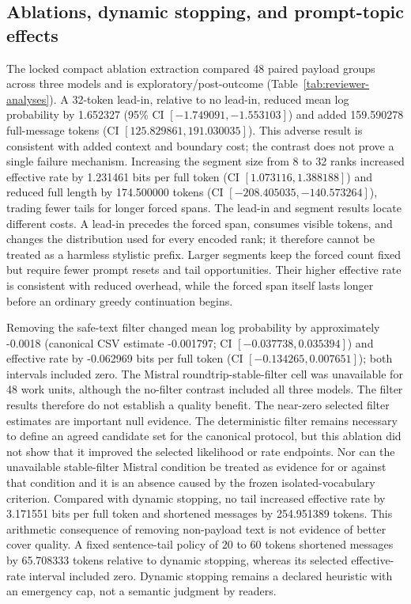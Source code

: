 \documentclass[fleqn,10pt]{wlscirep}
\begin{document}
\subsection*{Ablations, dynamic stopping, and prompt-topic effects}\label{sec:results-ablations}

The locked compact ablation extraction compared 48 paired payload groups across three models and is exploratory/post-outcome (Table~\ref{tab:reviewer-analyses}). A 32-token lead-in, relative to no lead-in, reduced mean log probability by 1.652327 (95\% CI \([-1.749091,\allowbreak -1.553103]\)) and added 159.590278 full-message tokens (CI \([125.829861,\allowbreak 191.030035]\)). This adverse result is consistent with added context and boundary cost; the contrast does not prove a single failure mechanism. Increasing the segment size from 8 to 32 ranks increased effective rate by 1.231461 bits per full token (CI \([1.073116,\allowbreak 1.388188]\)) and reduced full length by 174.500000 tokens (CI \([-208.405035,\allowbreak -140.573264]\)), trading fewer tails for longer forced spans.
The lead-in and segment results locate different costs. A lead-in precedes the forced span, consumes visible tokens, and changes the distribution used for every encoded rank; it therefore cannot be treated as a harmless stylistic prefix. Larger segments keep the forced count fixed but require fewer prompt resets and tail opportunities. Their higher effective rate is consistent with reduced overhead, while the forced span itself lasts longer before an ordinary greedy continuation begins.

Removing the safe-text filter changed mean log probability by approximately -0.0018 (canonical CSV estimate -0.001797; CI \([-0.037738, 0.035394]\)) and effective rate by -0.062969 bits per full token (CI \([-0.134265, 0.007651]\)); both intervals included zero. The Mistral roundtrip-stable-filter cell was unavailable for 48 work units, although the no-filter contrast included all three models. The filter results therefore do not establish a quality benefit.
The near-zero selected filter estimates are important null evidence. The deterministic filter remains necessary to define an agreed candidate set for the canonical protocol, but this ablation did not show that it improved the selected likelihood or rate endpoints. Nor can the unavailable stable-filter Mistral condition be treated as evidence for or against that condition and it is an absence caused by the frozen isolated-vocabulary criterion.
Compared with dynamic stopping, no tail increased effective rate by 3.171551 bits per full token and shortened messages by 254.951389 tokens. This arithmetic consequence of removing non-payload text is not evidence of better cover quality. A fixed sentence-tail policy of \(20\) to \(60\) tokens shortened messages by 65.708333 tokens relative to dynamic stopping, whereas its selected effective-rate interval included zero. Dynamic stopping remains a declared heuristic with an emergency cap, not a semantic judgment by readers.
\end{document}
